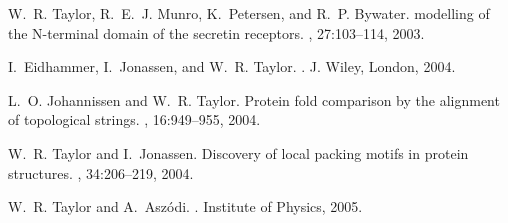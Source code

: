 \begin{thebibliography}{100}
W.~R. Taylor, R.~E.~J. Munro, K.~Petersen, and R.~P. Bywater.
 modelling of the {N}-terminal domain of the secretin
  receptors.
, 27:103--114, 2003.

I.~Eidhammer, I.~Jonassen, and W.~R. Taylor.
.
\newblock J. Wiley, London, 2004.

L.~O. Johannissen and W.~R. Taylor.
\newblock Protein fold comparison by the alignment of topological strings.
, 16:949--955, 2004.

W.~R. Taylor and I.~Jonassen.
\newblock Discovery of local packing motifs in protein structures.
, 34:206--219, 2004.

W.~R. Taylor and A.~Asz\'odi.
.
\newblock Institute of Physics, 2005.


\end{thebibliography}
